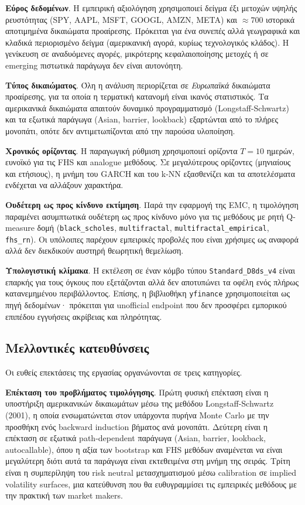 \documentclass[12pt]{article}
\begin{document}
\textbf{Εύρος δεδομένων}. Η εμπειρική αξιολόγηση χρησιμοποιεί δείγμα έξι μετοχών υψηλής ρευστότητας (SPY, AAPL, MSFT, GOOGL, AMZN, META) και $\approx 700$ ιστορικά αποτιμημένα δικαιώματα προαίρεσης. Πρόκειται για ένα συνεπές αλλά γεωγραφικά και κλαδικά περιορισμένο δείγμα (αμερικανική αγορά, κυρίως τεχνολογικός κλάδος). Η γενίκευση σε αναδυόμενες αγορές, μικρότερης κεφαλαιοποίησης μετοχές ή σε emerging πιστωτικά παράγωγα δεν είναι αυτονόητη.

\textbf{Τύπος δικαιώματος}. Όλη η ανάλυση περιορίζεται σε \emph{Ευρωπαϊκά} δικαιώματα προαίρεσης, για τα οποία η τερματική κατανομή είναι ικανός στατιστικός. Τα αμερικανικά δικαιώματα απαιτούν δυναμικό προγραμματισμό (Longstaff-Schwartz) και τα εξωτικά παράγωγα (Asian, barrier, lookback) εξαρτώνται από το πλήρες μονοπάτι, οπότε δεν αντιμετωπίζονται από την παρούσα υλοποίηση.

\textbf{Χρονικός ορίζοντας}. Η παραγωγική ρύθμιση χρησιμοποιεί ορίζοντα $T = 10$ ημερών, ευνοϊκό για τις FHS και analogue μεθόδους. Σε μεγαλύτερους ορίζοντες (μηνιαίους και ετήσιους), η μνήμη του GARCH και του k-NN εξασθενίζει και τα αποτελέσματα ενδέχεται να αλλάξουν χαρακτήρα.

\textbf{Ουδέτερη ως προς κίνδυνο εκτίμηση}. Παρά την εφαρμογή της EMC, η τιμολόγηση παραμένει ασυμπτωτικά ουδέτερη ως προς κίνδυνο μόνο για τις μεθόδους με ρητή Q-measure δομή (\texttt{black\_scholes}, \texttt{multifractal}, \texttt{multifractal\_empirical}, \texttt{fhs\_rn}). Οι υπόλοιπες παρέχουν εμπειρικές προβολές που είναι χρήσιμες ως αναφορά αλλά δεν διεκδικούν αυστηρή θεωρητική θεμελίωση.

\textbf{Υπολογιστική κλίμακα}. Η εκτέλεση σε έναν κόμβο τύπου \texttt{Standard\_D8ds\_v4} είναι επαρκής για τους όγκους που εξετάζονται αλλά δεν αποτυπώνει τα οφέλη ενός πλήρως κατανεμημένου περιβάλλοντος. Επίσης, η βιβλιοθήκη \texttt{yfinance} χρησιμοποιείται ως πηγή δεδομένων· πρόκειται για unofficial endpoint που δεν προσφέρει εμπορικού επιπέδου εγγυήσεις ακρίβειας και πληρότητας.

\subsection{Μελλοντικές κατευθύνσεις}
Οι ευθείς επεκτάσεις της εργασίας οργανώνονται σε τρεις κατηγορίες.

\textbf{Επέκταση του προβλήματος τιμολόγησης}. Πρώτη φυσική επέκταση είναι η υποστήριξη αμερικανικών δικαιωμάτων μέσω της μεθόδου Longstaff-Schwartz (2001), η οποία ενσωματώνεται στον υπάρχοντα πυρήνα Monte Carlo με την προσθήκη ενός backward induction βήματος ανά μονοπάτι. Δεύτερη είναι η επέκταση σε εξωτικά path-dependent παράγωγα (Asian, barrier, lookback, autocallable), όπου η αξία των bootstrap και FHS μεθόδων αναμένεται να είναι μεγαλύτερη διότι αυτά τα παράγωγα είναι εκτεθειμένα στη μνήμη της σειράς. Τρίτη είναι η συμπερίληψη του risk neutral μετασχηματισμού μέσω calibration σε implied volatility surfaces, μια κατεύθυνση που θα ευθυγραμμίσει τις εμπειρικές μεθόδους με την πρακτική των market makers.
\end{document}
